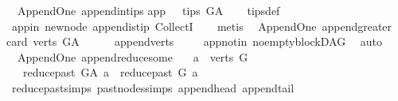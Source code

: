 \begin{isabellebody}
%
\endisadelimproof
\isanewline
{}\isamarkupfalse%
\ {\isacharparenleft}{\kern0pt}\ Append{\isacharunderscore}{\kern0pt}One{\isacharparenright}{\kern0pt}\ append{\isacharunderscore}{\kern0pt}in{\isacharunderscore}{\kern0pt}tips{\isacharcolon}{\kern0pt}\isanewline
{\isachardoublequoteopen}app\ \ {\isasymin}\ tips\ G{\isacharunderscore}{\kern0pt}A{\isachardoublequoteclose}\isanewline
%
\isadelimproof
\ \ %
\endisadelimproof
%
\isatagproof
{}\isamarkupfalse%
\ tips{\isacharunderscore}{\kern0pt}def\ \ \isanewline
\ \ \isamarkupfalse%
\ app{\isacharunderscore}{\kern0pt}in\ new{\isacharunderscore}{\kern0pt}node\ append{\isacharunderscore}{\kern0pt}is{\isacharunderscore}{\kern0pt}tip\ CollectI\isanewline
\ \ \isamarkupfalse%
\ metis%
\endisatagproof
{\isafoldproof}%
%
\isadelimproof
\isanewline
%
\endisadelimproof
\isanewline
{}\isamarkupfalse%
\ {\isacharparenleft}{\kern0pt}\ Append{\isacharunderscore}{\kern0pt}One{\isacharparenright}{\kern0pt}\ append{\isacharunderscore}{\kern0pt}greater{\isacharunderscore}{\kern0pt}{}{\isacharcolon}{\kern0pt}\isanewline
{\isachardoublequoteopen}card\ {\isacharparenleft}{\kern0pt}verts\ G{\isacharunderscore}{\kern0pt}A{\isacharparenright}{\kern0pt}\ {\isachargreater}{\kern0pt}\ {}{\isachardoublequoteclose}\isanewline
%
\isadelimproof
\ \ %
\endisadelimproof
%
\isatagproof
{}\isamarkupfalse%
\ append{\isacharunderscore}{\kern0pt}verts\ \isanewline
\ \ \isamarkupfalse%
\ app{\isacharunderscore}{\kern0pt}notin\ no{\isacharunderscore}{\kern0pt}empty{\isacharunderscore}{\kern0pt}blockDAG\ \isamarkupfalse%
\ auto%
\endisatagproof
{\isafoldproof}%
%
\isadelimproof
\ \ \isanewline
%
\endisadelimproof
\isanewline
{}\isamarkupfalse%
\ {\isacharparenleft}{\kern0pt}\ Append{\isacharunderscore}{\kern0pt}One{\isacharparenright}{\kern0pt}\ append{\isacharunderscore}{\kern0pt}reduce{\isacharunderscore}{\kern0pt}some{\isacharcolon}{\kern0pt}\isanewline
\ \ \ {\isachardoublequoteopen}a\ {\isasymin}\ verts\ G{\isachardoublequoteclose}\isanewline
\ \ \ {\isachardoublequoteopen}reduce{\isacharunderscore}{\kern0pt}past\ G{\isacharunderscore}{\kern0pt}A\ a\ {\isacharequal}{\kern0pt}\ reduce{\isacharunderscore}{\kern0pt}past\ G\ a{\isachardoublequoteclose}\isanewline
%
\isadelimproof
\ \ %
\endisadelimproof
%
\isatagproof
{}\isamarkupfalse%
\ reduce{\isacharunderscore}{\kern0pt}past{\isachardot}{\kern0pt}simps\ past{\isacharunderscore}{\kern0pt}nodes{\isachardot}{\kern0pt}simps\ append{\isacharunderscore}{\kern0pt}head\ append{\isacharunderscore}{\kern0pt}tail\ \isanewline

\end{isabellebody}
